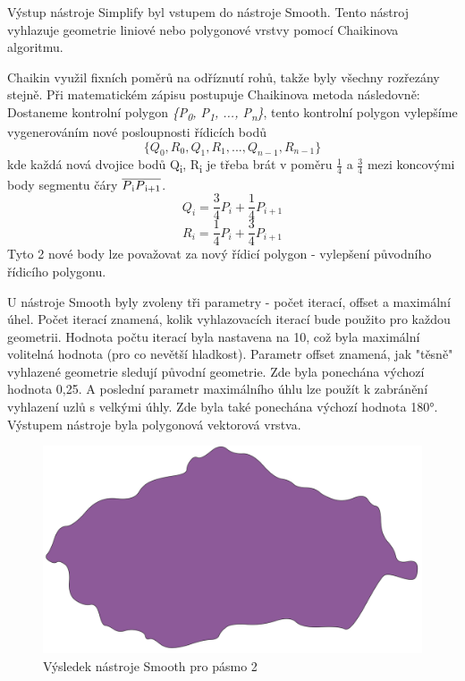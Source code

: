Výstup nástroje Simplify byl vstupem do nástroje Smooth. Tento nástroj vyhlazuje geometrie
liniové nebo polygonové vrstvy pomocí Chaikinova algoritmu.

Chaikin využil fixních poměrů na odříznutí rohů, takže byly všechny rozřezány stejně. 
Při matematickém zápisu postupuje Chaikinova metoda následovně: Dostaneme kontrolní polygon 
\textit{\{P\textsubscript{0}, P\textsubscript{1}, ..., P\textsubscript{n}\}},
tento kontrolní polygon vylepšíme vygenerováním nové posloupnosti řídicích bodů 
\[ \{Q_0, R_0, Q_1, R_1, ...,  Q_{n−1}, R_{n−1}\} \]                                    
kde každá nová dvojice bodů Q\textsubscript{i}, R\textsubscript{i} je třeba brát v poměru \(\frac{1}{4}\)
a \(\frac{3}{4}\) mezi koncovými body segmentu čáry \(\overline{P\textsubscript{i}P\textsubscript{i+1}}\).
\[Q_i = \frac{3}{4}P_i + \frac{1}{4}P_{i+1}\]
\[R_i = \frac{1}{4}P_i + \frac{3}{4}P_{i+1}\]
Tyto 2 nové body lze považovat za nový řídicí polygon - vylepšení původního řídicího polygonu. \cite{chaikin} 

U nástroje Smooth byly zvoleny tři parametry - počet iterací, offset a maximální úhel.
Počet iterací znamená, kolik vyhlazovacích iterací bude použito pro každou geometrii.
Hodnota počtu iterací byla nastavena na 10, což byla maximální volitelná hodnota (pro co nevětší hladkost).
Parametr offset znamená, jak "těsně" vyhlazené geometrie sledují původní geometrie.
Zde byla ponechána výchozí hodnota 0,25. A poslední parametr maximálního úhlu lze použít
k zabránění vyhlazení uzlů s velkými úhly. Zde byla také ponechána výchozí hodnota 180°.
Výstupem nástroje byla polygonová vektorová vrstva.

\begin{figure}[H] \centering
    \includegraphics[width=400pt]{./pictures/smooth.png}
    \caption[Výsledek nástroje Smooth pro pásmo 2]{Výsledek nástroje Smooth pro pásmo 2}
	\label{fig:smooth}                                
\end{figure}
